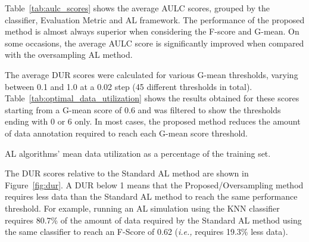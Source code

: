 Table~\ref{tab:aulc_scores} shows the average AULC scores, grouped by the
classifier, Evaluation Metric and AL framework. The performance of the
proposed method is almost always superior when considering the F-score and
G-mean. On some occasions, the average AULC score is significantly improved
when compared with the oversampling AL method.

\begin{table}
	\centering
    \setlength{\tabcolsep}{2.5pt}
    \caption[Average AULC of each AL configuration tested.]{%
        \label{tab:aulc_scores}
        Average AULC of each AL configuration tested. Each AULC score is
        calculated using the performance scores of each iteration in the
        validation set. By the end of the iterative process, each AL
        configuration used a maximum of 80\% instances of the 60\% instances
        that compose the training sets (\textit{i.e.,} 48\% of the entire
        preprocessed dataset).
    }
\end{table}

The average DUR scores were calculated for various G-mean thresholds, varying
between 0.1 and 1.0 at a 0.02 step (45 different thresholds in total).
Table~\ref{tab:optimal_data_utilization} shows the results obtained for these
scores starting from a G-mean score of 0.6 and was filtered to show the
thresholds ending with 0 or 6 only. In most cases, the proposed method reduces
the amount of data annotation required to reach each G-mean score threshold.

\begin{table}[t]
    \centering
    \setlength{\tabcolsep}{2.5pt}
    \caption{\label{tab:optimal_data_utilization}
        AL algorithms' mean data utilization as a percentage of the
        training set.
    }
\end{table}

The DUR scores relative to the Standard AL method are shown in
Figure~\ref{fig:dur}. A DUR below 1 means that the Proposed/Oversampling
method requires less data than the Standard AL method to reach the same
performance threshold. For example, running an AL simulation using the KNN
classifier requires 80.7\% of the amount of data required by the Standard AL
method using the same classifier to reach an F-Score of 0.62 (\textit{i.e.,}
requires 19.3\% less data).

